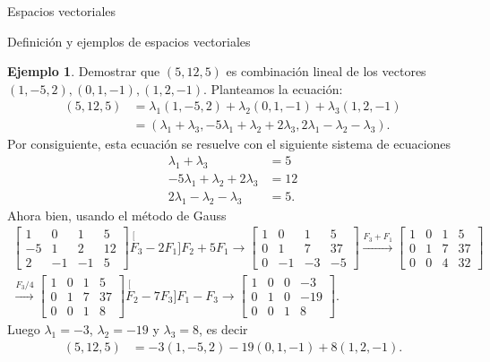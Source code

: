 \documentclass[a4paper,12pt,twoside,spanish]{amsbook}
\theoremstyle{definition}
\newtheorem{ejemplo}{Ejemplo}[section]
\theoremstyle{remark}
\begin{document}
\begin{chapter}{Espacios vectoriales}
\begin{section}{Definición y ejemplos de espacios vectoriales}
		
		\begin{ejemplo} Demostrar que $(5,12,5)$  es combinación lineal de los vectores $(1,-5,2), (0,1,-1), (1,2,-1)$. Planteamos la ecuación:
			\begin{align*}
				(5,12,5) &= \lambda_1(1,-5,2)+\lambda_2 (0,1,-1)+\lambda_3 (1,2,-1) 
				\\&= (\lambda_1+\lambda_3,-5\lambda_1+\lambda_2+2\lambda_3,2\lambda_1-\lambda_2-\lambda_3).
			\end{align*}
			Por consiguiente,  esta ecuación se resuelve con el siguiente sistema de ecuaciones
			\begin{align*}
				\lambda_1+\lambda_3 &= 5 \\
				-5\lambda_1+\lambda_2+2\lambda_3 &= 12 \\
				2\lambda_1-\lambda_2-\lambda_3 &= 5.
			\end{align*}
			Ahora bien, usando el método de Gauss
								\begin{multline*}
			\left[\begin{array}{rrr|r}1 & 0 & 1 &  5 \\ -5 & 1 & 2 &  12 \\	2 & -1 & -1 &  5  \end{array}\right]
			\stackrel[F_3 -2F_1]{F_2 + 5F_1}{\longrightarrow} 
			\left[\begin{array}{rrr|r}1 & 0 & 1 &  5 \\ 0 & 1 & 7 &  37 \\	0 & -1 & -3 &  -5  \end{array}\right]
			\stackrel{F_3+F_1}{\longrightarrow} 
			\left[\begin{array}{rrr|r}1 & 0 & 1 &  5 \\ 0 & 1 & 7 &  37 \\	0 & 0 & 4 & 32  \end{array}\right]
			\\
			\stackrel{F_3/4}{\longrightarrow} 
			\left[\begin{array}{rrr|r}1 & 0 & 1 & 5 \\ 0 & 1 & 7 & 37 \\	0 & 0 & 1& 8  \end{array}\right]
			\stackrel[F_2 -7F_3]{F_1 - F_3}{\longrightarrow}
			\left[\begin{array}{rrr|r}1 & 0 & 0 & -3 \\ 0 & 1 & 0 &  -19 \\	0 & 0 & 1& 8  \end{array}\right].
			\end{multline*}	
			Luego $\lambda_1= -3$, $\lambda_2 = -19$ y $\lambda_3=8$,  es decir
			\begin{align*}
			(5,12,5) &= -3(1,-5,2)-19 (0,1,-1)+8 (1,2,-1).
			\end{align*}
		\end{ejemplo}
\end{section}
	

\end{chapter}
\end{document}

